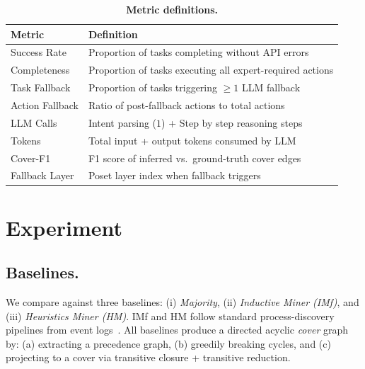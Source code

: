 \documentclass{article}
\theoremstyle{plain}
\theoremstyle{definition}
\theoremstyle{remark}
\begin{document}
\begin{table}[h]
\centering
\caption{\textbf{Metric definitions.}}
\label{tab:metric_definitions}
\begin{small}
\begin{tabular}{@{}lp{8cm}@{}}
\toprule
Metric & Definition \\
\midrule
Success Rate & Proportion of tasks completing without API errors \\
Completeness & Proportion of tasks executing all expert-required actions \\
Task Fallback & Proportion of tasks triggering $\geq 1$ LLM fallback \\
Action Fallback & Ratio of post-fallback actions to total actions \\
LLM Calls & Intent parsing ($1$) + Step by step reasoning steps \\
Tokens & Total input + output tokens consumed by LLM \\
Cover-F1 & F1 score of inferred vs.\ ground-truth cover edges \\
Fallback Layer & Poset layer index when fallback triggers \\
\bottomrule
\end{tabular}
\end{small}
\end{table}



\section{Experiment}

\subsection{Baselines.}
\label{app:alog_base}
We compare against three baselines: (i) \emph{Majority}, (ii) \emph{Inductive Miner (IMf)},
and (iii) \emph{Heuristics Miner (HM)}.
IMf and HM follow standard process-discovery pipelines from event logs~\cite{leemans2013discovering,weijters2006process}. 
All baselines produce a directed acyclic \emph{cover} graph by:
(a) extracting a precedence graph, (b) greedily breaking cycles,
and (c) projecting to a cover via transitive closure + transitive reduction.
\end{document}
